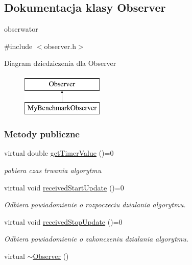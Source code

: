 \hypertarget{class_observer}{\subsection{Dokumentacja klasy Observer}
\label{class_observer}
}


obserwator  




{\ttfamily \#include $<$observer.\-h$>$}

Diagram dziedziczenia dla Observer\begin{figure}[H]
\begin{center}
\leavevmode
\includegraphics[height=2.000000cm]{class_observer}
\end{center}
\end{figure}
\subsubsection*{Metody publiczne}
\begin{DoxyCompactItemize}
\item 
virtual double \hyperlink{class_observer_a5ea7b52632401a92b7ba0aca5bceceaa}{get\-Timer\-Value} ()=0
\begin{DoxyCompactList}\small\item\em pobiera czas trwania algorytmu \end{DoxyCompactList}\item 
virtual void \hyperlink{class_observer_a69ca89633f4624b79ec696a049793ba4}{received\-Start\-Update} ()=0
\begin{DoxyCompactList}\small\item\em Odbiera powiadomienie o rozpoczeciu dzialania algorytmu. \end{DoxyCompactList}\item 
virtual void \hyperlink{class_observer_a8eb646ac3407c4d24d01178a6ba74f7f}{received\-Stop\-Update} ()=0
\begin{DoxyCompactList}\small\item\em Odbiera powiadomienie o zakonczeniu dzialania algorytmu. \end{DoxyCompactList}\item 
virtual \hyperlink{class_observer_afcc6b67be6c386f2f3d2c363aa59cb47}{$\sim$\-Observer} ()
\end{DoxyCompactItemize}



